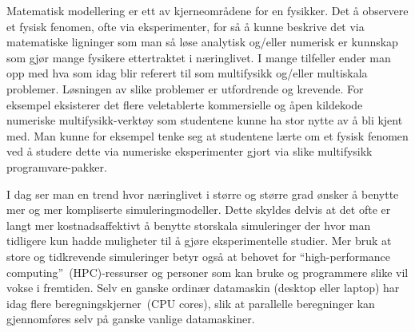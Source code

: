 \documentclass{article}
\begin{document}
Matematisk modellering er ett av kjerneområdene for en fysikker. Det å observere et fysisk fenomen, ofte via eksperimenter, for så å kunne beskrive det via matematiske ligninger som man så løse analytisk og/eller numerisk er kunnskap som gjør mange fysikere ettertraktet i næringlivet. I mange tilfeller ender man opp med hva som idag blir referert til som multifysikk og/eller multiskala problemer. Løsningen av slike problemer er utfordrende og krevende. For eksempel eksisterer det flere veletablerte kommersielle og åpen kildekode numeriske multifysikk-verktøy som studentene kunne ha stor nytte av å bli kjent med. Man kunne for eksempel tenke seg at studentene lærte om et fysisk fenomen ved å studere dette via numeriske eksperimenter gjort via slike multifysikk programvare-pakker.

I dag ser man en trend hvor næringlivet i større og større grad ønsker å benytte mer og mer kompliserte simuleringmodeller. Dette skyldes delvis at det ofte er langt mer kostnadsaffektivt å benytte storskala simuleringer der hvor man tidligere kun hadde muligheter til å gjøre eksperimentelle studier. Mer bruk at store og tidkrevende simuleringer betyr også at behovet for ``high-performance computing''~(HPC)-ressurser og personer som kan bruke og programmere slike vil vokse i fremtiden. Selv en ganske ordinær datamaskin (desktop eller laptop) har idag flere beregningskjerner~(CPU cores), slik at parallelle beregninger kan gjennomføres selv på ganske vanlige datamaskiner.
\end{document}
